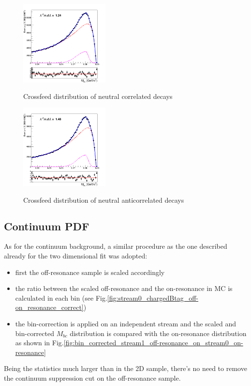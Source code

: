 \newpage

\begin{figure}[H]
\centering
{\includegraphics[width=0.40\textwidth]{05-BtagFit/figs/ChargedCrossfeed_stream0_corrLambdaC_neutalBtag_MbcFit.png}}
\caption{Crossfeed distribution of neutral correlated decays}
\label{fig:ChargedCrossfeed_stream0_corrLambdaC_neutalBtag_MbcFit}
\end{figure}

\begin{figure}[H]
\centering
{\includegraphics[width=0.40\textwidth]{05-BtagFit/figs/ChargedCrossfeed_stream0_anticorrLambdaC_neutralBtag_MbcFit.png}}
\caption{Crossfeed distribution  of neutral anticorrelated decays}
\label{fig:ChargedCrossfeed_stream0_anticorrLambdaC_neutralBtag_MbcFit}
\end{figure}

\newpage

\subsection{Continuum PDF}
\noindent  As for the continuum background, a similar procedure as the one described already for the two dimensional fit was adopted:

\begin{itemize}
    \item first the off-resonance sample is scaled accordingly
    \item the ratio between the scaled off-resonance and the on-resonance in MC is calculated in each bin (see Fig.\ref{fig:stream0_chargedBtag_off-on_resonance_correct})
    \item the bin-correction is applied on an independent stream and the scaled and bin-corrected $M_{bc}$ distribution is compared with the on-resonance distribution as shown in Fig.\ref{fig:bin_corrected_stream1_off-resonance_on_stream0_on-resonance}
\end{itemize}
\vspace{0.5cm}
Being the statistics much larger than in the 2D sample, there's no need to remove the continuum suppression cut on the off-resonance sample. 

